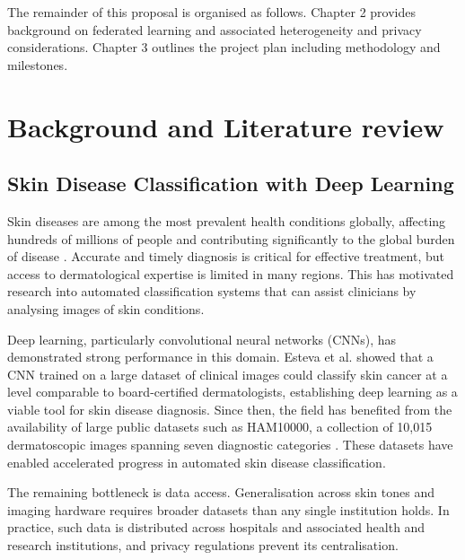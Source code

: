 \documentclass[12pt,openany,a4paper]{book}
\begin{document}
  The remainder of this proposal is organised as follows. Chapter 2 provides background on federated learning and associated heterogeneity and privacy considerations. Chapter 3 outlines the project plan including methodology and milestones.

\chapter{Background and Literature review}

\section{Skin Disease Classification with Deep Learning}
Skin diseases are among the most prevalent health conditions globally, affecting hundreds of millions of people and contributing significantly to the global burden of disease \cite{hayGlobalBurdenSkin2014}. Accurate and timely diagnosis is critical for effective treatment, but access to dermatological expertise is limited in many regions. This has motivated research into automated classification systems that can assist clinicians by analysing images of skin conditions.

Deep learning, particularly convolutional neural networks (CNNs), has demonstrated strong performance in this domain. Esteva et al. \cite{estevaDermatologistlevelClassificationSkin2017} showed that a CNN trained on a large dataset of clinical images could classify skin cancer at a level comparable to board-certified dermatologists, establishing deep learning as a viable tool for skin disease diagnosis. Since then, the field has benefited from the availability of large public datasets such as HAM10000, a collection of 10,015 dermatoscopic images spanning seven diagnostic categories \cite{tschandlHAM10000DatasetLarge2018}. These datasets have enabled accelerated progress in automated skin disease classification.

The remaining bottleneck is data access. Generalisation across skin tones and imaging hardware requires broader datasets than any single institution holds. In practice, such data is distributed across hospitals and associated health and research institutions, and privacy regulations prevent its centralisation.
\end{document}
